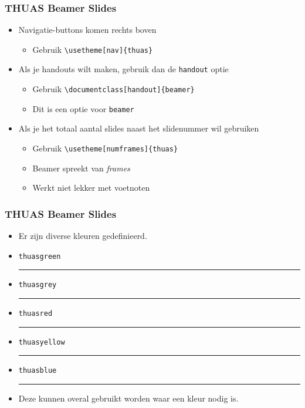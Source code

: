\documentclass[fleqn,aspectratio=169,dutch,10pt]{beamer}
\begin{document}
\begin{frame}[fragile]
\frametitle{THUAS Beamer Slides}
\begin{itemize}
\item Navigatie-buttons komen rechts boven
\begin{itemize}
\item Gebruik \lstinline|\usetheme[nav]{thuas}|
\end{itemize}
\item Als je handouts wilt maken, gebruik dan de \lstinline|handout| optie
\begin{itemize}
\item Gebruik \lstinline|\documentclass[handout]{beamer}|
\item Dit is een optie voor \lstinline|beamer|
\end{itemize}
\item Als je het totaal aantal slides naast het slidenummer wil gebruiken
\begin{itemize}
\item Gebruik \lstinline|\usetheme[numframes]{thuas}|
\item Beamer spreekt van \textsl{frames}
\item Werkt niet lekker met voetnoten
\end{itemize}
\end{itemize}
\end{frame}


\begin{frame}[fragile]
\frametitle{THUAS Beamer Slides}
\begin{itemize}
\item Er zijn diverse kleuren gedefinieerd.
\bigskip
\item \lstinline|thuasgreen| \textcolor{thuasgreen}{\rule{5pt}{5pt}}
\item \lstinline|thuasgrey| \textcolor{thuasgrey}{\rule{5pt}{5pt}}
\item \lstinline|thuasred| \textcolor{thuasred}{\rule{5pt}{5pt}}
\item \lstinline|thuasyellow| \textcolor{thuasyellow}{\rule{5pt}{5pt}}
\item \lstinline|thuasblue| \textcolor{thuasblue}{\rule{5pt}{5pt}}
\bigskip
\item Deze kunnen overal gebruikt worden waar een kleur nodig is.
\end{itemize}
\end{frame}
\end{document}

